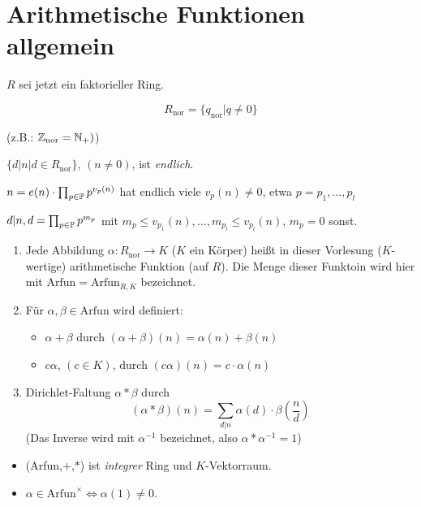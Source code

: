 \documentclass[a4paper,twoside,DIV15,BCOR12mm]{scrbook}
\begin{document}
\section{Arithmetische Funktionen allgemein}

$R$ sei jetzt ein faktorieller Ring.
\begin{definition}
\[ R_\text{nor} = \{ q_{\text{nor}} | q \ne 0 \} \]
\end{definition}
(z.B.: $\mathbb{Z}_\text{nor} = \mathbb{N}_+)$)

\begin{bemerkung}
$\{d|n \big | d\in R_\text{nor}\}$, $(n\ne 0)$, ist \emph{endlich}.

$n= e(n) \cdot \prod_{p\in\mathbb{P}} p^{v_p(n)}$ hat endlich viele
$v_p(n)\ne 0$, etwa $p=p_1,\ldots,p_l$

$d|n, d=\prod_{p\in\mathbb{P}} p^{m_p}$ mit $m_p\le v_{p_1}(n), \ldots,
m_{p_l} \le v_{p_l}(n)$, $m_p=0$ sonst.
\end{bemerkung}

\begin{definition}
\begin{enumerate}
\item Jede Abbildung $\alpha: R_\text{nor} \to K$ ($K$ ein Körper) heißt in dieser Vorlesung ($K$-wertige) arithmetische Funktion (auf $R$). Die Menge dieser Funktoin wird hier mit $\text{Arfun} = \text{Arfun}_{R,K}$ bezeichnet.
\item Für $\alpha,\beta \in \text{Arfun}$ wird definiert:
\begin{itemize}
\item $\alpha + \beta$ durch $(\alpha + \beta)(n) = \alpha(n) + \beta(n)$
\item $c\alpha$, $(c\in K)$, durch $(c\alpha)(n) = c \cdot \alpha(n)$
\end{itemize}
\item Dirichlet-Faltung $\alpha * \beta$ durch
\[ (\alpha * \beta) (n)  = \sum_{d|n} \alpha(d) \cdot \beta(\frac nd) \]
(Das Inverse wird mit $\alpha^{-1}$ bezeichnet, also $\alpha *
\alpha^{-1} = 1$)
\end{enumerate}
\end{definition}

\begin{satz}
\begin{itemize}
\item (Arfun,$+$,$*$) ist \emph{integrer} Ring und $K$-Vektorraum.
\item $\alpha\in\text{Arfun}^\times \iff \alpha(1) \ne 0$. \end{itemize}
\end{satz}
\end{document}
